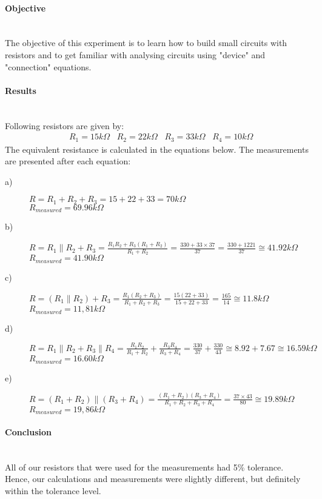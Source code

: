 \paragraph*{Objective} \hfill \\
The objective of this experiment is to learn how to build small circuits with resistors and to get familiar with analysing circuits using "device" and "connection" equations.

\paragraph*{Results} \hfill \\
Following resistors are given by: \hfill \\
\begin{align*}
& R_{1}=15k\Omega \,\,\,\,\,  R_{2}=22k\Omega \,\,\,\,\,  R_{3}=33k\Omega \,\,\,\,\, R_{4}=10k\Omega 
\end{align*}
The equivalent resistance is calculated in the equations below. The measurements are presented after each equation: \\

\begin{description}
\item[a)] $ R=R_{1}+R_{2}+R_{3}= 15+22+33= 70k\Omega $  \hfill \\
$ R_{measured}=69.96k\Omega $ \hfill \\

\item[b)] $ R=R_{1} \parallel R_{2}+R_{3}= \frac{R_{1}R_{2}+R_{3}(R_{1}+R_{2})}{R_{1}+R_{2}}=\frac{330+33\times 37}{37}=\frac{330+1221}{37} \cong 41.92 k\Omega $ \hfill \\
$ R_{measured}=41.90k\Omega $ \hfill \\

\item[c)] $ R=(R_{1} \parallel R_{2})+R_{3}= \frac{R_{1}(R_{2}+R_{3})}{R_{1}+R_{2}+R_{3}}=\frac{15(22+33)}{15+22+33}=\frac{165}{14} \cong 11.8 k\Omega $ \hfill \\
$ R_{measured}=11,81k\Omega $ \hfill \\

\item[d)] $ R=R_{1}\parallel R_{2}+R_{3} \parallel R_{4} = \frac{R_{1}R_{2}}{R_{1}+R_{2}} +\frac{R_{3}R_{4}}{R_{3}+R_{4}} = \frac{330}{37}+\frac{330}{43} \cong 8.92+7.67 \cong 16.59 k\Omega $ \hfill \\
$ R_{measured}=16.60k\Omega $ \hfill \\

\item[e)] $ R=(R_{1}+R_{2}) \parallel (R_{3}+R_{4})= \frac{(R_{1}+R_{2})(R_{3}+R_{4})}{R_{1}+R_{2}+R_{3}+R_{4}}= \frac{37\times 43}{80} \cong 19.89 k\Omega $ \hfill \\
$ R_{measured}=19,86k\Omega $ \hfill \\
\end{description}

\paragraph*{Conclusion} \hfill \\
All of our resistors that were used for the measurements had 5\% tolerance. Hence, our calculations and measurements were slightly different, but definitely within the tolerance level.

